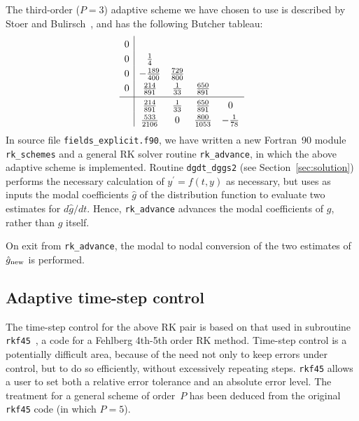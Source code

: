 \documentclass[10pt,a4paper]{article}
\begin{document}
The third-order ($P=3$) adaptive scheme we have chosen to use is described by
Stoer and Bulirsch~\cite{stoer_bulirsch}, and has the following Butcher
tableau:
\begin{equation}
\begin{array}{c|cccc}
\rule{0pt}{4mm} 0 & & & & \\
\rule{0pt}{4mm} 0 & \frac{1}{4} & & & \\
\rule{0pt}{4mm} 0 & -\frac{189}{400} & \frac{729}{800} & & \\
\rule[-2mm]{0pt}{6mm} 0 & \frac{214}{891} & \frac{1}{33} & \frac{650}{891} & \\ \hline
\rule{0pt}{4mm}  & \frac{214}{891} & \frac{1}{33} & \frac{650}{891} & 0 \\
\rule{0pt}{4mm}  & \frac{533}{2106} & 0 & \frac{800}{1053} & -\frac{1}{78} \\
\end{array}
\end{equation}
In source file \texttt{fields\_explicit.f90}, we have written a new Fortran~90
module \texttt{rk\_schemes} and a general RK solver routine
\texttt{rk\_advance}, in which the above adaptive scheme is
implemented. Routine \texttt{dgdt\_dggs2} (see Section~\ref{sec:solution})
performs the necessary calculation of $y^\prime = f(t,y)$ as necessary, but
uses as inputs the modal coefficients $\hat{g}$ of the distribution function
to evaluate two estimates for $d\hat{g}/dt$. Hence, \texttt{rk\_advance}
advances the modal coefficients of $g$, rather than $g$ itself.

On exit from \texttt{rk\_advance}, the modal to nodal conversion of the two
estimates of $\hat{g}_{\mbox{\scriptsize new}}$ is performed.

\subsection{Adaptive time-step control}
\label{sec:control}

The time-step control for the above RK pair is based on that used in
subroutine \texttt{rkf45}~\cite{rkf45}, a code for a Fehlberg 4th-5th order RK
method. Time-step control is a potentially difficult area, because of the need
not only to keep errors under control, but to do so efficiently, without
excessively repeating steps. \texttt{rkf45} allows a user to set both a
relative error tolerance and an absolute error level. The treatment for a
general scheme of order~$P$ has been deduced from the original \texttt{rkf45}
code (in which $P=5$).
\end{document}

